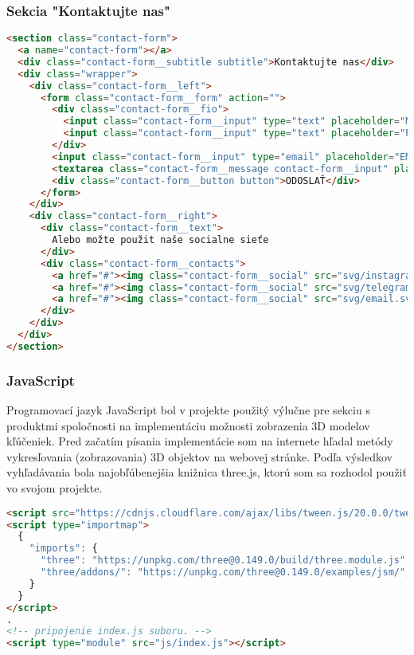       \subsubsection*{Sekcia "Kontaktujte nas"}
\begin{lstlisting}[language=html]
<section class="contact-form">
  <a name="contact-form"></a>
  <div class="contact-form__subtitle subtitle">Kontaktujte nas</div>
  <div class="wrapper">
    <div class="contact-form__left">
      <form class="contact-form__form" action="">
        <div class="contact-form__fio">
          <input class="contact-form__input" type="text" placeholder="MENO" >
          <input class="contact-form__input" type="text" placeholder="PRIEZVISKO">
        </div>
        <input class="contact-form__input" type="email" placeholder="EMAIL"><br>
        <textarea class="contact-form__message contact-form__input" placeholder="SPRAVA"></textarea>
        <div class="contact-form__button button">ODOSLAŤ</div>
      </form>
    </div>
    <div class="contact-form__right">
      <div class="contact-form__text">
        Alebo možte použit naše socialne sieťe
      </div>
      <div class="contact-form__contacts">
        <a href="#"><img class="contact-form__social" src="svg/instagram.svg" alt="instagram"></a>
        <a href="#"><img class="contact-form__social" src="svg/telegram.svg" alt="telegram"></a>
        <a href="#"><img class="contact-form__social" src="svg/email.svg" alt="email"></a>
      </div>
    </div>
  </div>
</section>
\end{lstlisting}
      \subsubsection*{JavaScript}
        Programovací jazyk JavaScript bol v projekte použitý výlučne pre sekciu s produktmi spoločnosti na implementáciu možnosti zobrazenia 3D modelov kľúčeniek. Pred začatím písania implementácie som na internete hľadal metódy vykresľovania (zobrazovania) 3D objektov na webovej stránke. Podľa výsledkov vyhľadávania bola najobľúbenejšia knižnica three.js, ktorú som sa rozhodol použiť vo svojom projekte. \\

\begin{lstlisting}[language=html]
<script src="https://cdnjs.cloudflare.com/ajax/libs/tween.js/20.0.0/tween.umd.js"></script>
<script type="importmap">
  {
    "imports": {
      "three": "https://unpkg.com/three@0.149.0/build/three.module.js",
      "three/addons/": "https://unpkg.com/three@0.149.0/examples/jsm/",
    }
  }
</script>
.
<!-- pripojenie index.js suboru. -->
<script type="module" src="js/index.js"></script>
\end{lstlisting}



